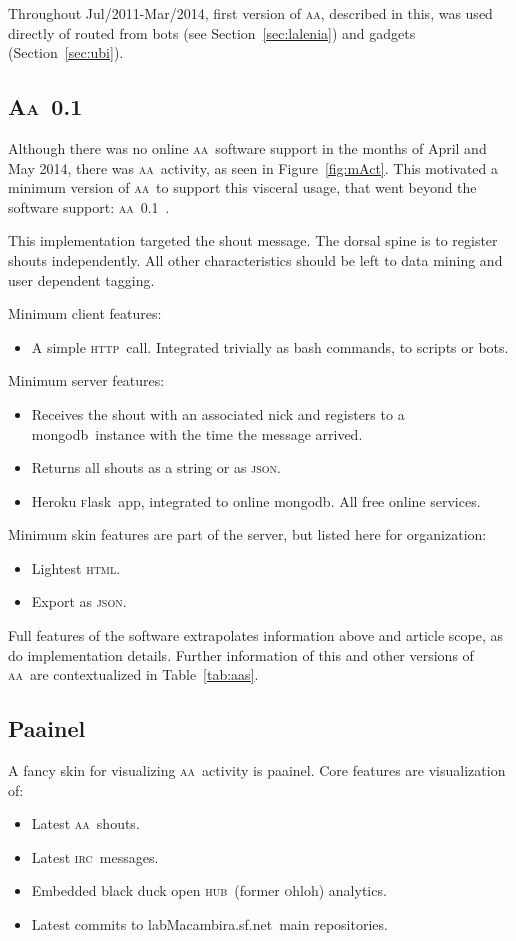 \documentclass[a4paper, 11pt]{article} %
\newcommand{\bdoh}{{\sc b}lack {\sc d}uck {\sc o}pen \textsc{hub}}
\newcommand{\ohloh}{\textsc{o}hloh}
\newcommand{\irc}{\textsc{irc}}
\newcommand{\httpb}{\textsc{http}}
\newcommand{\html}{\textsc{html}}
\newcommand{\aab}{\textsc{aa}}
\newcommand{\json}{\textsc{json}}
\newcommand{\flask}{\textsc{f}lask}
\newcommand{\aai}{\textsc{Aa}}
\newcommand{\mongodb}{{\sc m}ongo{\sc db}}
\newcommand{\paaineli}{P{\bf \sc aa}inel}
\newcommand{\paainel}{p{\sc aa}inel}
\newcommand{\lm}{lab\textsc{M}acambira.sf.net}
\begin{document}
Throughout Jul/2011-Mar/2014, first version of \aab, described in this, was used directly of routed from bots (see Section~\ref{sec:lalenia}) and gadgets (Section~\ref{sec:ubi}).

\subsection{\aai\ 0.1}\label{sec:aaFirst}
Although there was no online \aab\ software support in the months of April and May 2014, there was \aab\ activity, as seen in Figure~\ref{fig:mAct}. This motivated a minimum version of \aab\ to support this visceral usage, that went beyond the software support: \aab\ 0.1~\cite{aa01r}.

This implementation targeted the shout message. The dorsal spine is to register shouts independently. All other characteristics should be left to data mining and user dependent tagging.

Minimum client features:
\begin{itemize}
    \item A simple \httpb\ call. Integrated trivially as bash commands, to scripts or bots.
\end{itemize}

Minimum server features:
\begin{itemize}
    \item Receives the shout with an associated nick and registers to a \mongodb\ instance with the time the message arrived.
    \item Returns all shouts as a string or as \json.
    \item Heroku \flask\ app, integrated to online \mongodb. All free online services. 
\end{itemize}

Minimum skin features are part of the server, but listed here for organization:
\begin{itemize}
    \item Lightest \html.
    \item Export as \json.
\end{itemize}

Full features of the software extrapolates information above and article scope, as do implementation details. Further information of this and other versions of \aab\ are contextualized in Table~\ref{tab:aas}.


\subsection{\paaineli}\label{sec:aaPaainel}
A fancy skin for visualizing \aab\ activity is \paainel. Core features are visualization of:
\begin{itemize}
    \item Latest \aab\ shouts.
    \item Latest \irc\ messages.
    \item Embedded \bdoh\ (former \ohloh) analytics.
    \item Latest commits to \lm\ main repositories.
\end{itemize}
\end{document}

